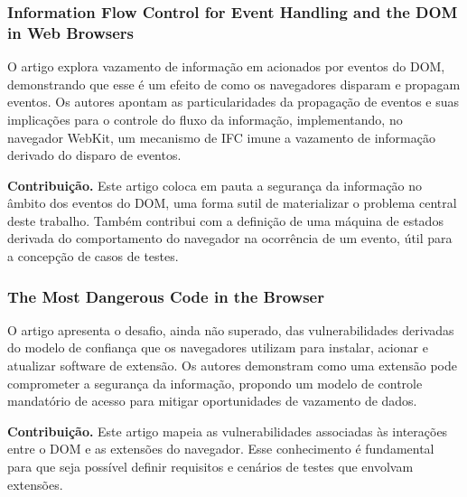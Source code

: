 \subsubsection{Information Flow Control for Event Handling and the DOM in Web Browsers \cite{Rajani2015}}
O artigo explora vazamento de informação em \scripts acionados por eventos do DOM, demonstrando que esse é um efeito de como os navegadores disparam e propagam eventos. Os autores apontam as particularidades da propagação de eventos e suas implicações para o controle do fluxo da informação, implementando, no navegador WebKit, um mecanismo de IFC imune a vazamento de informação derivado do disparo de eventos.

\textbf{Contribuição.} Este artigo coloca em pauta a segurança da informação no âmbito dos eventos do DOM, uma forma sutil de materializar o problema central deste trabalho. Também contribui com a definição de uma máquina de estados derivada do comportamento do navegador na ocorrência de um evento, útil para a concepção de casos de testes.


\subsubsection{The Most Dangerous Code in the Browser \cite{Heule2015_Most_Dangerous_Code}}
O artigo apresenta o desafio, ainda não superado, das vulnerabilidades derivadas do modelo de confiança que os navegadores utilizam para instalar, acionar e atualizar software de extensão. Os autores demonstram como uma extensão pode comprometer a segurança da informação, propondo um modelo de controle mandatório de acesso para mitigar oportunidades de vazamento de dados.

\textbf{Contribuição.} Este artigo mapeia as vulnerabilidades associadas às interações entre o DOM e as extensões do navegador. Esse conhecimento é fundamental para que seja possível definir requisitos e cenários de testes que envolvam extensões.